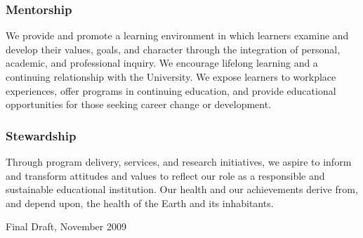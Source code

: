 \documentclass[10pt,DIVcalc,oneside,letterpaper,headexclude]{scrreprt}
\begin{document}
\begin{multicols}{2}
\subsubsection{\color{Maroon}Mentorship}
We provide and promote a learning environment in which learners examine and develop their values, goals, and character through the integration of personal, academic, and professional inquiry. We encourage lifelong learning and a continuing relationship with the University. We expose learners to workplace experiences, offer programs in continuing education, and provide  educational opportunities for those seeking career change or development. 


\subsubsection{\color{Maroon}Stewardship}
Through program delivery, services, and research initiatives, we aspire to inform and transform attitudes and values to reflect our role as a responsible and sustainable educational institution. Our health and our achievements derive from, and depend upon, the health of the Earth and its inhabitants.

\vspace{1cm}
\noindent
\textsf{Final Draft, November 2009}

\end{multicols}
\end{document}
